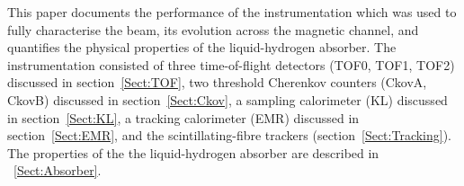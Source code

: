 This paper documents the performance of the instrumentation which was
used to fully characterise the beam, its evolution across the magnetic
channel, and quantifies the physical properties of the liquid-hydrogen
absorber.
The instrumentation consisted of three time-of-flight detectors
(TOF0, TOF1, TOF2) discussed in section~\ref{Sect:TOF}, two 
threshold Cherenkov counters (CkovA, CkovB) discussed in
section~\ref{Sect:Ckov}, a sampling calorimeter (KL) discussed in
section~\ref{Sect:KL}, a tracking calorimeter (EMR) discussed in
section~\ref{Sect:EMR}, and the scintillating-fibre trackers
(section~\ref{Sect:Tracking}).
The properties of the the liquid-hydrogen
absorber are described in ~\ref{Sect:Absorber}.
